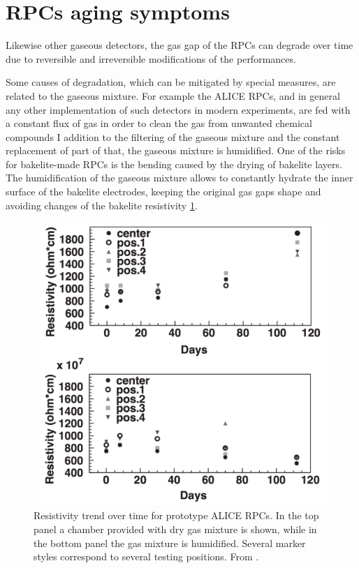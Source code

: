 \section{RPCs aging symptoms}
Likewise other gaseous detectors, the gas gap of the RPCs can degrade over time due to reversible and irreversible modifications of the performances.

Some causes of degradation, which can be mitigated by special measures, are related to the gaseous mixture.
For example the ALICE RPCs, and in general any other implementation of such detectors in modern experiments, are fed with a constant flux of gas in order to clean the gas from unwanted chemical compounds
I addition to the filtering of the gaseous mixture and the constant replacement of part of that, the gaseous mixture is humidified.
One of the risks for bakelite-made RPCs is the bending caused by the drying of bakelite layers.
The humidification of the gaseous mixture allows to constantly hydrate the inner surface of the bakelite electrodes, keeping the original gas gaps shape and avoiding changes of the bakelite resistivity \ref{fig:drywet}.

\begin{figure}[!t]
\begin{center}
\includegraphics[width=0.95\linewidth]{Chapters/Performance/Figs/dry_vs_wet.png}
\caption{Resistivity trend over time for prototype ALICE RPCs. In the top panel a chamber provided with dry gas mixture is shown, while in the bottom panel the gas mixture is humidified. Several marker styles correspond to several testing positions. From \cite{aliceRPC:2004}.}
\label{fig:drywet}
\end{center}
\end{figure}


